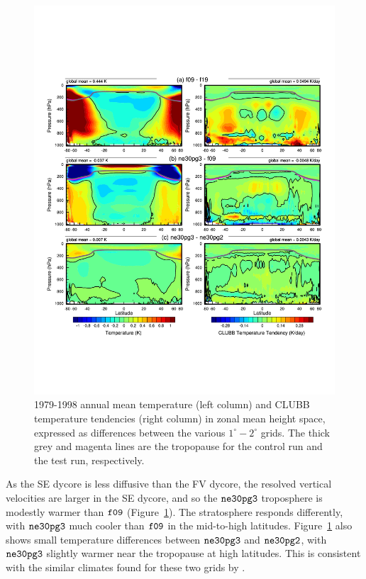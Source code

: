 \documentclass[draft]{agujournal2019}
\begin{document}
\begin{figure}[t]
\begin{center}
         \includegraphics[width=130mm]{figs/temp_dhgt_panel_STEND_CLUBB-lores.pdf}
\end{center}
\caption{1979-1998 annual mean temperature (left column) and CLUBB temperature tendencies (right column) in zonal mean height space, expressed as differences between the various $1^{\circ}-2^{\circ}$ grids. The thick grey and magenta lines are the tropopause for the control run and the test run, respectively.}
\label{fig:dT-lores}
\end{figure}

As the SE dycore is less diffusive than the FV dycore, the resolved vertical velocities are larger in the SE dycore, and so the $\tt ne30pg3$ troposphere is modestly warmer than $\tt f09$ (Figure~\ref{fig:dT-lores}). The stratosphere responds differently, with $\tt ne30pg3$ much cooler than $\tt f09$ in the mid-to-high latitudes. Figure~\ref{fig:dT-lores} also shows small temperature differences between $\tt ne30pg3$ and $\tt ne30pg2$, with  $\tt ne30pg3$ slightly warmer near the tropopause at high latitudes. This is consistent with the similar climates found for these two grids by .
\end{document}
